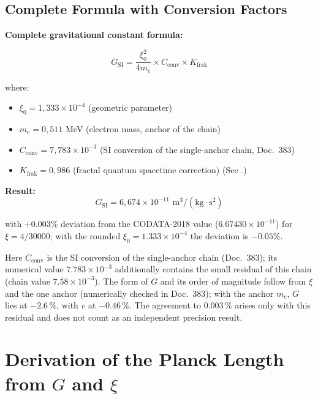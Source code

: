 	\subsection{Complete Formula with Conversion Factors}
	
	\begin{keyresult}
		\textbf{Complete gravitational constant formula:}
		
		\begin{equation}
			\boxed{G_{\text{SI}} = \frac{\xi_0^2}{4 m_e} \times C_{\text{conv}} \times K_{\text{frak}}}
			\label{eq:G_complete}
		\end{equation}
		
		where:
		\begin{itemize}
			\item $\xi_0 = 1{,}333 \times 10^{-4}$ (geometric parameter)
			\item $m_e = 0{,}511$ MeV (electron mass, anchor of the chain)
			\item $C_{\text{conv}} = 7{,}783 \times 10^{-3}$ (SI conversion of the single-anchor chain, Doc.~383)
			\item $K_{\text{frak}} = 0{,}986$ (fractal quantum spacetime correction) (See \cite{fractal_correction_derivation_En}.)
		\end{itemize}
		
		\textbf{Result:}
		\begin{equation}
			G_{\text{SI}} = 6{,}674 \times 10^{-11} \text{ m}^3/(\text{kg}\cdot\text{s}^2)
		\end{equation}
		
		with $+0.003\%$ deviation from the CODATA-2018 value ($6.67430 \times 10^{-11}$) for $\xi = 4/30000$; with the rounded $\xi_0 = 1.333 \times 10^{-4}$ the deviation is $-0.05\%$.
		
		Here $C_{\text{conv}}$ is the SI conversion of the single-anchor chain (Doc.~383); its numerical value $7.783\times10^{-3}$ additionally contains the small residual of this chain (chain value $7.58\times10^{-3}$). The form of $G$ and its order of magnitude follow from $\xi$ and the one anchor (numerically checked in Doc.~383); with the anchor $m_e$, $G$ lies at $-2.6\,\%$, with $v$ at $-0.46\,\%$. The agreement to $0.003\,\%$ arises only with this residual and does not count as an independent precision result.
	\end{keyresult}
	
	\section{Derivation of the Planck Length from $G$ and $\xi$}
	

